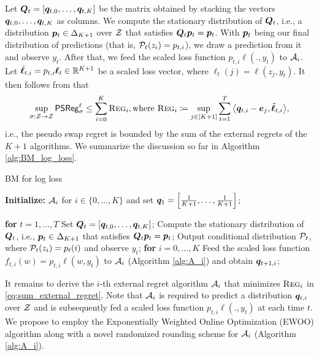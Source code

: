 Let ${\bm{Q}}_{t} = [{\bm{q}}_{t, 0}, \dots, {\bm{q}}_{t, K}]$ be the matrix obtained by stacking the vectors ${\bm{q}}_{t, 0}, \dots, {\bm{q}}_{t, K}$ as columns. We compute the stationary distribution of ${\bm{Q}}_{t}$, i.e., a distribution ${\bm{p}}_{t} \in \Delta_{K + 1}$ over $\mathcal{Z}$ that satisfies ${\bm{Q}}_{t}{\bm{p}}_{t} = {\bm{p}}_{t}$. 
With ${\bm{p}}_{t}$ being our final distribution of predictions (that is, $\mathcal{P}_t(z_i) = p_{t,i}$), we draw a prediction from it and observe $y_{t}$.
After that, we feed the scaled loss function $p_{t, i} \ell(., y_{t})$ to $\mathcal{A}_{i}$. Let $\tilde{\bm{\ell}}_{t, i} = p_{t, i} \bm{\ell}_{t} \in {\mathbb{R}}^{K + 1}$ be a scaled loss vector, where $\ell_{t}(j) = \ell(z_{j}, y_{t})$.  
It then follows from \cite[Theorem 5]{blum2007external} that \begin{align}\label{eq:sum_external_regret}
    \sup_{\sigma: \mathcal{Z} \to \mathcal{Z}} \mathsf{PSReg}_{\sigma} ^ {\ell} \le \sum_{i = 0} ^ {K} \textsc{Reg}_{i}, \text{where } \textsc{Reg}_{i} \coloneqq \sup_{j \in [K + 1]} {\sum_{t = 1} ^ {T} \left\langle {\ensuremath{\bm{q}}}_{t, i} - {\bm{e}}_{j}, \tilde{\bm{\ell}}_{t, i} \right\rangle},
\end{align}
i.e., the pseudo swap regret is bounded by the sum of the external regrets of the $K + 1$ algorithms.
We summarize the discussion so far in Algorithm \ref{alg:BM_log_loss}.

\begin{algorithm}[t]
                    \caption{BM for log loss} 
                    \label{alg:BM_log_loss}
                    \textbf{Initialize:} $\mathcal{A}_{i}$ for $i \in \{0, \dots, K\}$ and set ${\bm{q}}_{1} = \left[ \frac{1}{K + 1}, \dots, \frac{1}{K + 1} \right]$;
                    \begin{algorithmic}[1]
                            \STATE\textbf{for} $t = 1, \dots, T$
                            \STATE\hspace{3mm}Set ${\bm{Q}}_{t} = [{\bm{q}}_{t, 0}, \dots, {\bm{q}}_{t, K}]$;
                            \STATE\hspace{3mm}Compute the stationary distribution of ${\bm{Q}}_{t}$, i.e., ${\bm{p}}_{t} \in \Delta_{K + 1}$ that satisfies ${\bm{Q}}_{t}{\bm{p}}_{t} = {\bm{p}}_{t}$;
                            \STATE\hspace{3mm}Output conditional distribution $\mathcal{P}_{t}$, where $\mathcal{P}_{t}(z_{i}) = p_{t}(i)$ and observe $y_{t}$;
                            \STATE\hspace{3mm}\textbf{for} $i = 0, \dots, K$
                            \STATE\hspace{3mm}\hspace{3mm} Feed the scaled loss function $f_{t, i}(w) = p_{t, i} \ell(w, y_{t})$ to  $\mathcal{A}_{i}$ (Algorithm \ref{alg:A_i}) and obtain ${\bm{q}}_{t + 1, i}$; \\
                        \end{algorithmic}
\end{algorithm}	
It remains to 
derive the $i$-th external regret algorithm $\mathcal{A}_{i}$ that minimizes $\textsc{Reg}_{i}$ in \eqref{eq:sum_external_regret}. Note that $\mathcal{A}_{i}$ is required to predict a distribution ${\bm{q}}_{t, i}$ over $\mathcal{Z}$ and is subsequently fed a scaled loss function $p_{t, i} \ell(., y_{t})$ at each time $t$. We propose to employ the Exponentially Weighted Online Optimization (EWOO) algorithm along with a novel randomized rounding scheme for $\mathcal{A}_{i}$ (Algorithm \ref{alg:A_i}).

